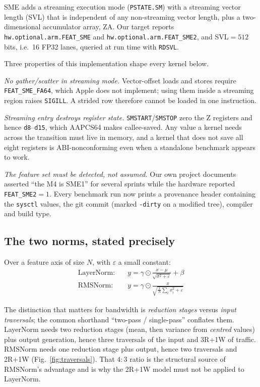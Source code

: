 \documentclass[conference,10pt]{IEEEtran}
\newcommand{\code}[1]{\texttt{\small #1}}
\begin{document}
SME adds a streaming execution mode (\code{PSTATE.SM}) with a streaming vector
length (SVL) that is independent of any non-streaming vector length, plus a
two-dimensional accumulator array, ZA. Our target reports
\code{hw.optional.arm.FEAT\_SME} and \code{hw.optional.arm.FEAT\_SME2}, and
SVL${}=512$ bits, i.e.\ 16 FP32 lanes, queried at run time with \code{RDSVL}.

Three properties of this implementation shape every kernel below.

\emph{No gather/scatter in streaming mode.} Vector-offset loads and stores
require \code{FEAT\_SME\_FA64}, which Apple does not implement; using them
inside a streaming region raises \code{SIGILL}. A strided row therefore cannot
be loaded in one instruction.

\emph{Streaming entry destroys register state.} \code{SMSTART}/\code{SMSTOP}
zero the Z registers and hence \code{d8}--\code{d15}, which AAPCS64 makes
callee-saved. Any value a kernel needs across the transition must live in
memory, and a kernel that does not save all eight registers is
ABI-nonconforming even when a standalone benchmark appears to work.

\emph{The feature set must be detected, not assumed.} Our own project documents
asserted ``the M4 is SME1'' for several sprints while the hardware reported
\code{FEAT\_SME2}${}=1$. Every benchmark run now prints a provenance header
containing the \code{sysctl} values, the git commit (marked \code{-dirty} on a
modified tree), compiler and build type.

\subsection{The two norms, stated precisely}

Over a feature axis of size $N$, with $\varepsilon$ a small constant:
\begin{align}
\text{LayerNorm:}\quad & y = \gamma \odot \frac{x-\mu}{\sqrt{\sigma^2+\varepsilon}} + \beta \\
\text{RMSNorm:}\quad   & y = \gamma \odot \frac{x}{\sqrt{\tfrac{1}{N}\sum_i x_i^2 + \varepsilon}}
\end{align}

The distinction that matters for bandwidth is \emph{reduction stages} versus
\emph{input traversals}; the common shorthand ``two-pass / single-pass''
conflates them. LayerNorm needs two reduction stages (mean, then variance from
\emph{centred} values) plus output generation, hence three traversals of the
input and 3R+1W of traffic. RMSNorm needs one reduction stage plus output,
hence two traversals and 2R+1W (Fig.~\ref{fig:traversals}). That $4{:}3$ ratio
is the structural source of
RMSNorm's advantage and is why the 2R+1W model must not be applied to
LayerNorm.
\end{document}
